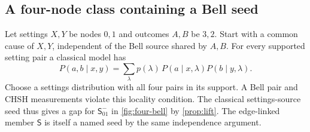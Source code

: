 \clearpage
\subsection{A four-node class containing a Bell seed}\label{sec:four-bell}
Let settings $X,Y$ be nodes $0,1$ and outcomes $A,B$ be $3,2$. Start with a common cause of $X,Y$,
independent of the Bell source shared by $A,B$. For every supported setting pair a classical model has
\[
 P(a,b\mid x,y)=\sum_\lambda p(\lambda)\,P(a\mid x,\lambda)P(b\mid y,\lambda).
\]
Choose a settings distribution with all four pairs in its support. A Bell pair and CHSH measurements
violate this locality condition. The classical settings-source seed thus gives a gap for
$\mathsf S_{01}^{-}$ in \cref{fig:four-bell} by \cref{prop:lift}. The edge-linked member $\mathsf S$
is itself a named seed by the same independence argument.

